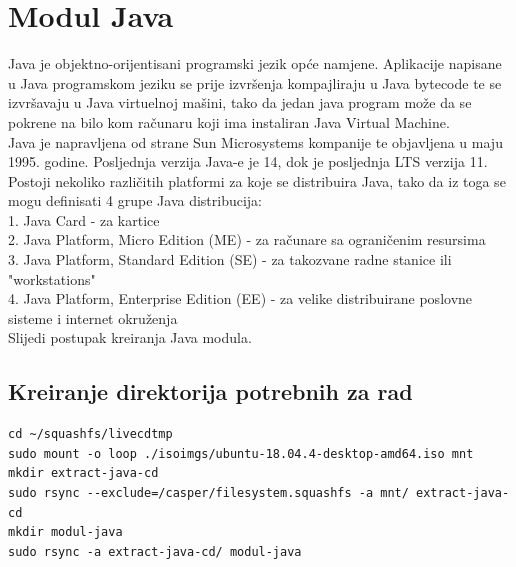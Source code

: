 \documentclass[12pt,vi]{mitthesis}
\begin{document}
\section*{Modul Java}
Java je objektno-orijentisani programski jezik opće namjene. Aplikacije napisane u Java programskom jeziku se prije izvršenja kompajliraju u Java bytecode te se izvršavaju u Java virtuelnoj mašini, tako da jedan java program može da se pokrene na bilo kom računaru koji ima instaliran Java Virtual Machine.\\
Java je napravljena od strane Sun Microsystems kompanije te objavljena u maju 1995. godine. Posljednja verzija Java-e je 14, dok je posljednja LTS verzija 11. Postoji nekoliko različitih platformi za koje se distribuira Java, tako da iz toga se mogu definisati 4 grupe Java distribucija:\\
1. Java Card - za kartice\\
2. Java Platform, Micro Edition (ME) - za računare sa ograničenim resursima\\
3. Java Platform, Standard Edition (SE) - za takozvane radne stanice ili "workstations"\\
4. Java Platform, Enterprise Edition (EE) - za velike distribuirane poslovne sisteme i internet okruženja\\
\indent
Slijedi postupak kreiranja Java modula.

\subsection*{Kreiranje direktorija potrebnih za rad}

\begin{lstlisting}[style=BashInputStyle]
cd ~/squashfs/livecdtmp
sudo mount -o loop ./isoimgs/ubuntu-18.04.4-desktop-amd64.iso mnt
mkdir extract-java-cd
sudo rsync --exclude=/casper/filesystem.squashfs -a mnt/ extract-java-cd
mkdir modul-java
sudo rsync -a extract-java-cd/ modul-java
\end{lstlisting}
\end{document}
